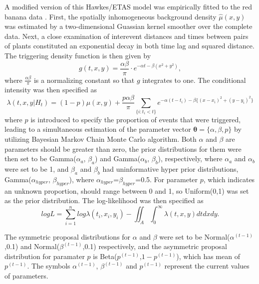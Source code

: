 \documentclass[11pt]{article}\usepackage[]{graphicx}\usepackage[]{color}
\begin{document}
{A modified version of this Hawkes/ETAS model was empirically fitted to the red banana data \citep{Balderama12}. First, the spatially inhomogeneous background density $\hat\mu(x,y)$ was estimated by a two-dimensional Guassian kernel smoother over the complete data. Next, a close examination of interevent distances and times between pairs of plants constituted an exponential decay in both time lag and squared distance. The triggering density function is then given by
\begin{equation}\label{gredbanana}
g(t,x,y) = \dfrac{\alpha \beta}{\pi} \cdot e^{-\alpha t - \beta(x^2+y^2)},
\end{equation}
where $\frac{\alpha\beta}{\pi}$ is a normalizing constant so that $g$ integrates to one. The conditional intensity was then specified as 
\begin{equation}\label{etasplants}
\lambda(t,x,y | H_t) = (1-p)\mu(x,y) + \dfrac{p \alpha \beta}{\pi} \sum_{\{i:t_i < t\}} e^{-\alpha (t-t_i) - \beta\{(x-x_i)^2+(y-y_i)^2\}}
\end{equation}
where $p$ is introduced to specify the proportion of events that were triggered, leading to a simultaneous estimation of the parameter vector $\boldsymbol{\theta} = \{\alpha, \beta, p\}$ by utilizing Bayesian Markov Chain Monte Carlo algorithm. Both $\alpha$ and $\beta$ are parameters should be greater than zero, the prior distributions for them were then set to be Gamma($\alpha_a$, $\beta_a$) and Gamma($\alpha_b$, $\beta_b$), respectively, where $\alpha_a$ and $\alpha_b$ were set to be 1, and $\beta_a$ and $\beta_b$ had uninformative hyper prior distributions, Gamma($\alpha_{hyper}$, $\beta_{hyper}$), where $\alpha_{hyper}$=$\beta_{hyper}$=0.5. For parameter $p$, which indicates an unknown proportion, should range between 0 and 1, so Uniform(0,1) was set as the prior distribution. The log-likelihood was then specified as
\begin{equation}
logL = \sum_{i=1}^{n} log\lambda(t_i,x_i,y_i) - \iint_A \int_{0}^{\infty}\lambda(t,x,y)dtdxdy.
\end{equation}

The symmetric proposal distributions for $\alpha$ and $\beta$ were set to be Normal($\alpha^{(t-1)}$,0.1) and Normal($\beta^{(t-1)}$,0.1) respectively, and the asymmetric proposal distribution for paramater $p$ is Beta($p^{(t-1)}$,$1-p^{(t-1)}$), which has mean of $p^{(t-1)}$. The symbols $\alpha^{(t-1)}$, $\beta^{(t-1)}$ and $p^{(t-1)}$ represent the current values of parameters. 

}
\end{document}
